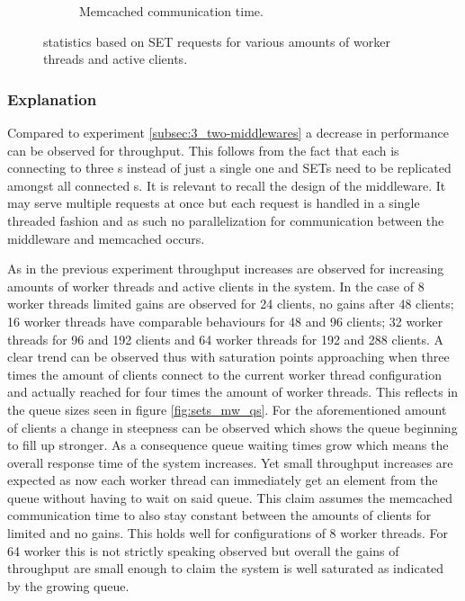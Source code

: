 \begin{figure}
{\begin{subfigure}[t!]{0.55\textwidth}
                \caption{Memcached communication time.\label{fig:sets_mw_mct}}
            \end{subfigure}
            \caption{\mw{} statistics based on SET requests for various amounts of worker threads and active
                     clients.\label{fig:mw_sets_sll}}
            }
        \end{figure}

        \subsubsection{Explanation\label{subsubsec:4_full-system_explanation}}

            Compared to experiment \ref{subsec:3_two-middlewares} a decrease in performance can be observed for
            throughput. This follows from the fact that each \mw{} is connecting to three \srv{}s instead of just a
            single one and SETs need to be replicated amongst all connected \srv{}s. It is relevant to recall the design
            of the middleware. It may serve multiple requests at once but each request is handled in a single threaded
            fashion and as such no parallelization for communication between the middleware and memcached occurs.

            As in the previous experiment throughput increases are observed for increasing amounts of worker threads and
            active clients in the system. In the case of 8 worker threads limited gains are observed for 24 clients, no
            gains after 48 clients; 16 worker threads have comparable behaviours for 48 and 96 clients; 32 worker
            threads for 96 and 192 clients and 64 worker threads for 192 and 288 clients. A clear trend can be observed
            thus with saturation points approaching when three times the amount of clients connect to the current
            worker thread configuration and actually reached for four times the amount of worker threads. This reflects
            in the queue sizes seen in figure \ref{fig:sets_mw_qs}. For the aforementioned amount of clients a change in
            steepness can be observed which shows the queue beginning to fill up stronger. As a consequence queue
            waiting times grow which means the overall response time of the system increases. Yet small throughput
            increases are expected as now each worker thread can immediately get an element from the queue without
            having to wait on said queue. This claim assumes the memcached communication time to also stay constant
            between the amounts of clients for limited and no gains. This holds well for configurations of 8 worker threads. For 64 worker this is not strictly speaking observed but overall the gains of throughput
            are small enough to claim the system is well saturated as indicated by the growing queue.

